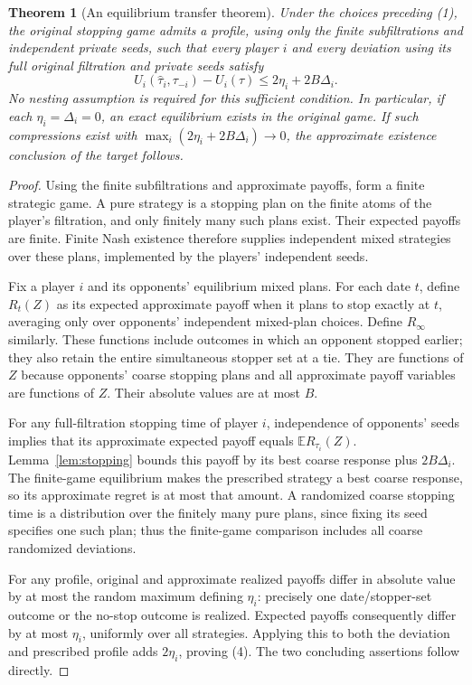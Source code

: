 \documentclass[11pt]{article}
\newtheorem{theorem}{Theorem}
\theoremstyle{remark}\newtheorem{remark}[theorem]{Remark}
\newcommand{\E}{\mathbb E}
\begin{document}
\begin{theorem}[An equilibrium transfer theorem]\label{thm:main}
Under the choices preceding (1), the original stopping game admits a profile, using only the finite subfiltrations and independent private seeds, such that every player $i$ and every deviation using its full original filtration and private seeds satisfy
\[
 U_i(\widehat\tau_i,\tau_{-i})-U_i(\tau)
       \leq 2\eta_i+2B\Delta_i.                               \tag{4}
\]
No nesting assumption is required for this sufficient condition. In particular, if each $\eta_i=\Delta_i=0$, an exact equilibrium exists in the original game. If such compressions exist with $\max_i(2\eta_i+2B\Delta_i)\to0$, the approximate existence conclusion of the target follows.
\end{theorem}
\begin{proof}
Using the finite subfiltrations and approximate payoffs, form a finite strategic game. A pure strategy is a stopping plan on the finite atoms of the player's filtration, and only finitely many such plans exist. Their expected payoffs are finite. Finite Nash existence therefore supplies independent mixed strategies over these plans, implemented by the players' independent seeds.

Fix a player $i$ and its opponents' equilibrium mixed plans. For each date $t$, define $R_t(Z)$ as its expected approximate payoff when it plans to stop exactly at $t$, averaging only over opponents' independent mixed-plan choices. Define $R_\infty$ similarly. These functions include outcomes in which an opponent stopped earlier; they also retain the entire simultaneous stopper set at a tie. They are functions of $Z$ because opponents' coarse stopping plans and all approximate payoff variables are functions of $Z$. Their absolute values are at most $B$.

For any full-filtration stopping time of player $i$, independence of opponents' seeds implies that its approximate expected payoff equals $\E R_{\tau_i}(Z)$. Lemma~\ref{lem:stopping} bounds this payoff by its best coarse response plus $2B\Delta_i$. The finite-game equilibrium makes the prescribed strategy a best coarse response, so its approximate regret is at most that amount. A randomized coarse stopping time is a distribution over the finitely many pure plans, since fixing its seed specifies one such plan; thus the finite-game comparison includes all coarse randomized deviations.

For any profile, original and approximate realized payoffs differ in absolute value by at most the random maximum defining $\eta_i$: precisely one date/stopper-set outcome or the no-stop outcome is realized. Expected payoffs consequently differ by at most $\eta_i$, uniformly over all strategies. Applying this to both the deviation and prescribed profile adds $2\eta_i$, proving (4). The two concluding assertions follow directly.
\end{proof}
\end{document}

